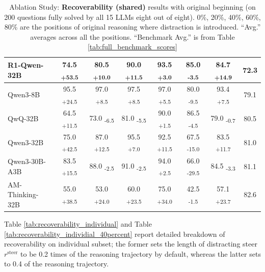 \documentclass{article} %
\begin{document}
\begin{table}[ht!]
{\begin{tabular}{lcccccc|c}
    R1-Qwen-32B     & 74.5 \textsubscript{+53.5} & 80.5 \textsubscript{+10.0} & 90.0 \textsubscript{+11.5} & 93.5 \textsubscript{+3.0} & 85.0 \textsubscript{-3.5} & 84.7 \textsubscript{+14.9} & 72.3 \\
    \midrule
    Qwen3-8B                & 95.5 \textsubscript{+24.5} & 97.0 \textsubscript{+8.5} & 97.5 \textsubscript{+8.5} & 97.0 \textsubscript{+5.5} & 80.0 \textsubscript{-9.5} & 93.4 \textsubscript{+7.5} & 79.1 \\
    QwQ-32B                 & 64.5 \textsubscript{+11.5} & 73.0 \textsubscript{-6.5} & 81.0 \textsubscript{-5.5} & 90.0 \textsubscript{+1.5} & 86.5 \textsubscript{-4.5} & 79.0 \textsubscript{-0.7} & 80.5 \\
    Qwen3-32B               & 75.0 \textsubscript{+42.5} & 87.0 \textsubscript{+12.5} & 95.5 \textsubscript{+7.0} & 92.5 \textsubscript{+11.5} & 67.5 \textsubscript{-15.0} & 83.5 \textsubscript{+11.7} & 81.0 \\
    Qwen3-30B-A3B           & 83.5 \textsubscript{+15.5} & 88.0 \textsubscript{-2.5} & 91.0 \textsubscript{-2.5} & 94.0 \textsubscript{+2.5} & 66.0 \textsubscript{-29.5} & 84.5 \textsubscript{-3.3} & 81.1 \\
    AM-Thinking-32B      & 55.0 \textsubscript{+38.5} & 53.0 \textsubscript{+24.0} & 60.0 \textsubscript{+23.5} & 75.0 \textsubscript{+34.0} & 42.5 \textsubscript{-1.5} & 57.1 \textsubscript{+23.7} & 82.6 \\
    \bottomrule
  \end{tabular}}
  \caption{Ablation Study: \textbf{Recoverability (shared)} results with original beginning (on 200 questions fully solved by all 15 LLMs eight out of eight). 0\%, 20\%, 40\%, 60\%, 80\% are the positions of original reasoning where distraction is introduced. ``Avg.'' averages across all the positions. ``Benchmark Avg.'' is from Table \ref{tab:full_benchmark_scores}}
  \label{tab:recoverability_shared_head}
\end{table}

\newpage
Table \ref{tab:recoverability_individual} and Table \ref{tab:recoverability_individial_40percent} report detailed breakdown of recoverability on individual subset; the former sets the length of distracting steer $r^\mathrm{steer}$ to be 0.2 times of the reasoning trajectory by default, whereas the latter sets to 0.4 of the reasoning trajectory.
\end{document}
